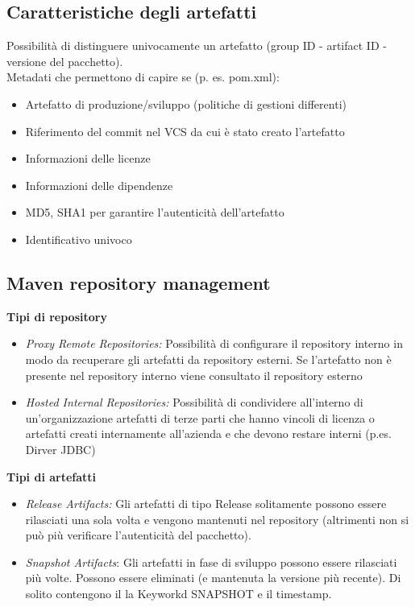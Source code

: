 \documentclass[10pt, a4paper]{article}
\begin{document}
\subsection{Caratteristiche degli artefatti}
Possibilità di distinguere univocamente un artefatto (group ID - artifact ID - versione del pacchetto).\\
Metadati che permettono di capire se (p. es. pom.xml):
\begin{itemize}
    \item Artefatto di produzione/sviluppo (politiche di gestioni differenti)
    \item Riferimento del commit nel VCS da cui è stato creato l’artefatto
    \item Informazioni delle licenze
    \item Informazioni delle dipendenze
    \item MD5, SHA1 per garantire l’autenticità dell’artefatto
    \item Identificativo univoco
\end{itemize}

\subsection{Maven repository management}
\textbf{Tipi di repository}
\begin{itemize}
    \item \textit{Proxy Remote Repositories:} Possibilità di configurare il repository interno in modo da
recuperare gli artefatti da repository esterni. Se l’artefatto non è presente nel
repository interno viene consultato il repository esterno
    \item \textit{Hosted Internal Repositories:} Possibilità di condividere all'interno di un’organizzazione
artefatti di terze parti che hanno vincoli di licenza o artefatti creati internamente all'azienda e che devono restare interni (p.es. Dirver JDBC)
\end{itemize}
\textbf{Tipi di artefatti}
\begin{itemize}
    \item \textit{Release Artifacts:} Gli artefatti di tipo Release solitamente possono essere rilasciati una
sola volta e vengono mantenuti nel repository (altrimenti non si può più verificare l'autenticità del pacchetto).
    \item \textit{Snapshot Artifacts}: Gli artefatti in fase di sviluppo possono essere rilasciati più volte.
Possono essere eliminati (e mantenuta la versione più recente). Di solito contengono
il la Keyworkd SNAPSHOT e il timestamp.
\end{itemize}
\end{document}
